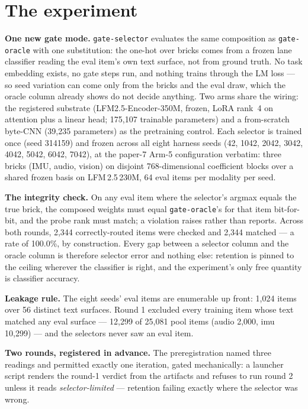 \documentclass[11pt]{article}
\begin{document}
\section{The experiment}

\textbf{One new gate mode.} \texttt{gate-selector} evaluates the same
composition as \texttt{gate-oracle} with one substitution: the one-hot over
bricks comes from a frozen lane classifier reading the eval item's own text
surface, not from ground truth. No task embedding exists, no gate steps run,
and nothing trains through the LM loss --- so seed variation can come only
from the bricks and the eval draw, which the oracle column already shows do
not decide anything. Two arms share the wiring: the registered substrate
(LFM2.5-Encoder-350M, frozen, LoRA rank~4 on attention plus a linear head;
175,107 trainable parameters) and a from-scratch byte-CNN
(39,235 parameters) as the pretraining control. Each selector is
trained once (seed 314159) and frozen across all eight harness
seeds (42, 1042, 2042, 3042, 4042, 5042, 6042, 7042), at the paper-7 Arm-5
configuration verbatim: three bricks (IMU, audio, vision) on disjoint
768-dimensional coefficient blocks over a shared frozen basis on
LFM\,2.5\,230M, 64 eval items per modality per seed.

\textbf{The integrity check.} On any eval item where the selector's argmax
equals the true brick, the composed weights must equal
\texttt{gate-oracle}'s for that item bit-for-bit, and the probe rank must
match; a violation raises rather than reports. Across both rounds,
2,344 correctly-routed items were checked and 2,344 matched
--- a rate of 100.0\%, by construction. Every gap between a selector column
and the oracle column is therefore selector error and nothing else: retention
is pinned to the ceiling wherever the classifier is right, and the
experiment's only free quantity is classifier accuracy.

\textbf{Leakage rule.} The eight seeds' eval items are enumerable up front:
1,024 items over
56 distinct text surfaces. Round 1 excluded
every training item whose text matched any eval surface ---
12,299 of 25,081 pool items
(audio 2,000, imu 10,299) --- and the selectors never saw an eval item.

\textbf{Two rounds, registered in advance.} The preregistration named three
readings and permitted exactly one iteration, gated mechanically: a launcher
script renders the round-1 verdict from the artifacts and refuses to run
round 2 unless it reads \emph{selector-limited} --- retention failing
exactly where the selector was wrong.
\end{document}
